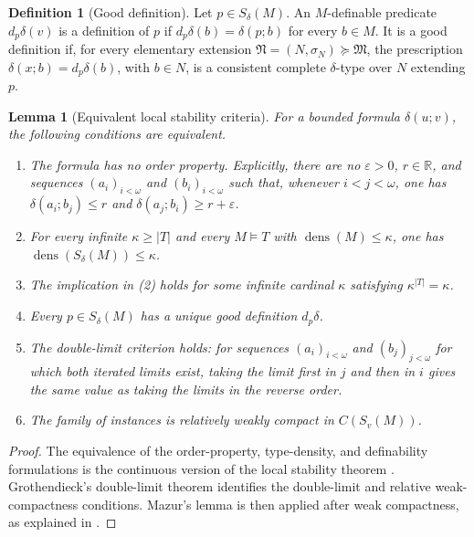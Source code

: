 \documentclass{amsart}
\newtheorem{lemma}[theorem]{Lemma}
\theoremstyle{definition}
\newtheorem{definition}{Definition}[section]
\theoremstyle{remark}
\numberwithin{equation}{section}
\begin{document}
\begin{definition}[Good definition]
Let $p\in S_\delta(M)$. An $M$-definable predicate
$d_p\delta(v)$ is a definition of $p$ if
$d_p\delta(b)=\delta(p;b)$ for every $b\in M$. It is a good
definition if, for every elementary extension $\mathfrak N=(N,\sigma_N)\succeq\mathfrak M$, the
prescription $\delta(x;b)=d_p\delta(b)$, with $b\in N$, is a
consistent complete $\delta$-type over $N$ extending $p$. %
\end{definition}

\begin{lemma}[Equivalent local stability criteria]
\label{lem:equivalent-local-stability-criteria}
For a bounded formula $\delta(u;v)$, the following conditions are
equivalent.
\begin{enumerate}
	\item The formula has no order property. Explicitly, there are no
	$\varepsilon>0$, $r\in\mathbb R$, and sequences $(a_i)_{i<\omega}$ and
	$(b_i)_{i<\omega}$ such that, whenever $i<j<\omega$, one has
	$\delta(a_i;b_j)\le r$ and
	$\delta(a_j;b_i)\ge r+\varepsilon$.
	
	\item For every infinite $\kappa\ge|T|$ and every $M\models T$ with
	$\operatorname{dens}(M)\le\kappa$, one has
	$\operatorname{dens}(S_\delta(M))\le\kappa$.
	
	\item The implication in (2) holds for some infinite cardinal $\kappa$ satisfying $\kappa^{|T|}=\kappa$.
	
	\item Every $p\in S_\delta(M)$ has a unique good definition
	$d_p\delta$.
	
	\item The double-limit criterion holds: for sequences $(a_i)_{i<\omega}$
	and $(b_j)_{j<\omega}$ for which both iterated limits exist, taking the
	limit first in $j$ and then in $i$ gives the same value as taking
	the limits in the reverse order.
	
	\item The family of instances is relatively weakly compact in $C(S_v(M))$.
\end{enumerate}
\end{lemma}

\begin{proof}
The equivalence of the order-property, type-density, and definability formulations is the continuous version of the local stability theorem \cite[Proposition~7.7]{Yaacov2008CONTINUOUSFO}. Grothendieck's
double-limit theorem identifies the double-limit and relative weak-compactness
conditions. Mazur's lemma is then applied after weak compactness, as explained in \cite[Theorem~5]{BenYaacov2014}.
\end{proof}
\end{document}

